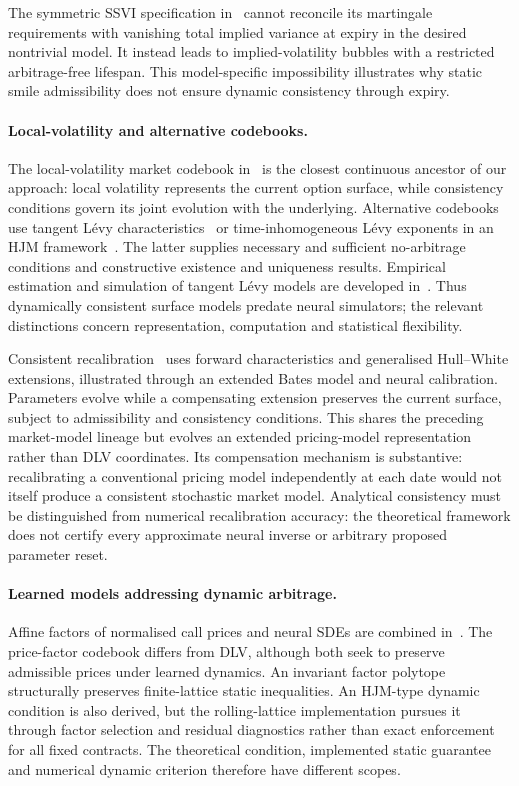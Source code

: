 The symmetric SSVI specification in~\cite{DysLitElAmrani2021} cannot reconcile its martingale requirements with
vanishing total implied variance at expiry in the desired nontrivial model. It instead leads to
implied-volatility bubbles with a restricted arbitrage-free lifespan. This model-specific impossibility
illustrates why static smile admissibility does not ensure dynamic consistency through
expiry.

\paragraph{Local-volatility and alternative codebooks.} The local-volatility market codebook in~\cite{CarmonaNadtochiy2009}
is the closest continuous ancestor of our approach: local volatility represents the current option
surface, while consistency conditions govern its joint evolution with the underlying. Alternative
codebooks use tangent L\'evy characteristics~\cite{TangentLevy} or time-inhomogeneous L\'evy exponents in an
HJM framework~\cite{KallsenKruhner2015}. The latter supplies necessary and sufficient no-arbitrage conditions and
constructive existence and uniqueness results. Empirical estimation and simulation of tangent
L\'evy models are developed in~\cite{CarmonaMaNadtochiy2017}. Thus dynamically consistent surface models predate neural
simulators; the relevant distinctions concern representation, computation and statistical flexibility.

Consistent recalibration~\cite{DysLitGambaraTeichmann2021} uses forward characteristics and generalised Hull--White extensions,
illustrated through an extended Bates model and neural calibration. Parameters evolve while a
compensating extension preserves the current surface, subject to admissibility and consistency
conditions. This shares the preceding market-model lineage but evolves an extended pricing-model
representation rather than DLV coordinates. Its compensation mechanism is substantive:
recalibrating a conventional pricing model independently at each date would not itself produce a
consistent stochastic market model. Analytical consistency must be distinguished from numerical
recalibration accuracy: the theoretical framework does not certify every approximate neural
inverse or arbitrary proposed parameter reset.

\paragraph{Learned models addressing dynamic arbitrage.} Affine factors of normalised call prices
and neural SDEs are combined in~\cite{Cohen02012023}. The price-factor codebook differs from DLV, although
both seek to preserve admissible prices under learned dynamics. An invariant factor polytope
structurally preserves finite-lattice static inequalities. An HJM-type dynamic condition is also
derived, but the rolling-lattice implementation pursues it through factor selection and residual
diagnostics rather than exact enforcement for all fixed contracts. The theoretical condition,
implemented static guarantee and numerical dynamic criterion therefore have different scopes.

